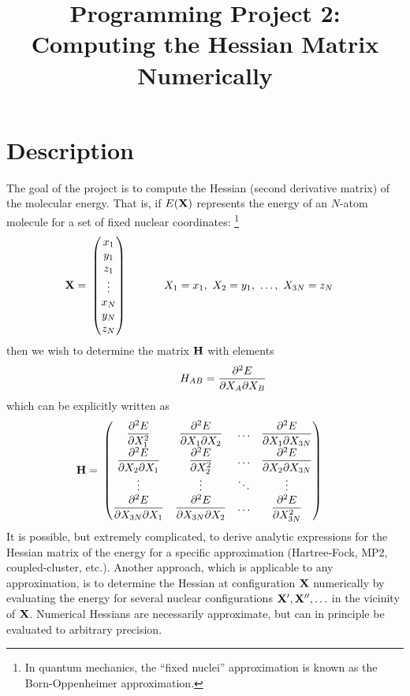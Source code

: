 \documentclass[11pt]{article}
\title{Programming Project 2: Computing the Hessian Matrix Numerically}
\date{}
\begin{document}
\maketitle

\section*{Description}

The goal of the project is to compute the Hessian (second derivative matrix) of
the molecular energy. That is, if $E(\mathbf{X})$ represents the energy of an
$N$-atom molecule for a set of fixed nuclear coordinates: \footnote{In quantum
mechanics, the ``fixed nuclei'' approximation is known as the Born-Oppenheimer
approximation.}
\begin{align}
    \mathbf{X} =&\ \left(\begin{matrix}x_1\\y_1\\z_1\\\vdots\\x_N\\y_N\\z_N\end{matrix}\right)\ \ \ \ \ \ \ \ \ \ 
    X_1=x_1,\ X_2=y_1,\ \ldots,\ X_{3N}=z_N
\end{align}
then we wish to determine the matrix $\mathbf{H}$ with elements
\begin{align}
    \ \ \ \ \ \ \ \ \ \  H_{AB} = \dfrac{\partial^2E}{\partial X_A\partial X_B}
\end{align}
which can be explicitly written as
\begin{align}
    \bo{H} =&\ 
    \ma{
            \fr{\pt^2E}{\pt X_1^2}     &   \fr{\pt^2E}{\pt X_1\pt X_2}  &  \ldots  & \fr{\pt^2E}{\pt X_1\pt X_{3N}} \\
          \fr{\pt^2E}{\pt X_2\pt X_1}  &     \fr{\pt^2E}{\pt X_2^2}     &  \ldots  & \fr{\pt^2E}{\pt X_2\pt X_{3N}} \\
                    \vdots             &             \vdots             &  \ddots  &             \vdots             \\
        \fr{\pt^2E}{\pt X_{3N}\pt X_1} & \fr{\pt^2E}{\pt X_{3N}\pt X_2} &  \ldots  &   \fr{\pt^2E}{\pt X_{3N}^2}     }
    \label{H}
\end{align}
It is possible, but extremely complicated, to derive analytic expressions for
the Hessian matrix of the energy for a specific approximation (Hartree-Fock,
MP2, coupled-cluster, etc.). Another approach, which is applicable to any
approximation, is to determine the Hessian at configuration $\mathbf{X}$
numerically by evaluating the energy for several nuclear configurations
$\mathbf{X}',\mathbf{X}'',\ldots$ in the vicinity of $\mathbf{X}$. Numerical Hessians are
necessarily approximate, but can in principle be evaluated to arbitrary
precision.
\end{document}
